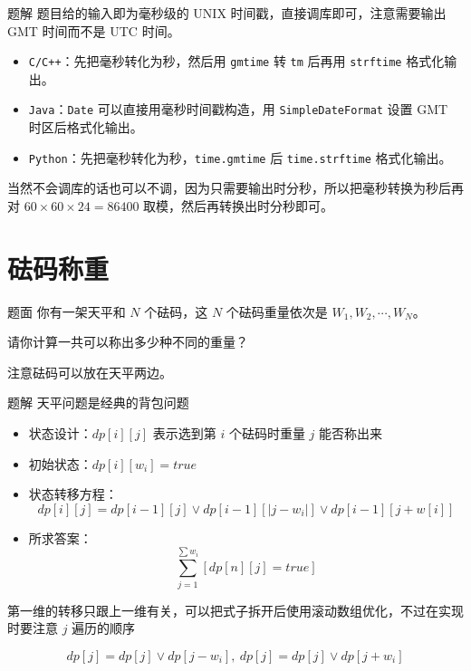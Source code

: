 \documentclass{pptt}
\begin{document}
\begin{frame}{题解}
    题目给的输入即为毫秒级的 UNIX 时间戳，直接调库即可，注意需要输出 GMT 时间而不是 UTC 时间。

    \begin{itemize}
        \item \texttt{C/C++}：先把毫秒转化为秒，然后用 \texttt{gmtime} 转 \texttt{tm} 后再用 \texttt{strftime} 格式化输出。
        \item \texttt{Java}：\texttt{Date} 可以直接用毫秒时间戳构造，用 \texttt{SimpleDateFormat} 设置 GMT 时区后格式化输出。
        \item \texttt{Python}：先把毫秒转化为秒，\texttt{time.gmtime} 后 \texttt{time.strftime} 格式化输出。
    \end{itemize}

    当然不会调库的话也可以不调，因为只需要输出时分秒，所以把毫秒转换为秒后再对 $60 \times 60 \times 24=86400$ 取模，然后再转换出时分秒即可。
\end{frame}

\section{砝码称重}

\begin{frame}{题面}
    你有一架天平和 $N$ 个砝码，这 $N$ 个砝码重量依次是 $W_1,W_2,\cdots,W_N$。

    请你计算一共可以称出多少种不同的重量？

    注意砝码可以放在天平两边。
\end{frame}

\begin{frame}{题解}
    天平问题是经典的背包问题

    \begin{itemize}
        \item 状态设计：$dp[i][j]$ 表示选到第 $i$ 个砝码时重量 $j$ 能否称出来
        \item 初始状态：$dp[i][w_i]=true$
        \item 状态转移方程：$$dp[i][j]=dp[i-1][j] \lor dp[i-1][|j-w_i|] \lor dp[i-1][j+w[i]]$$
        \item 所求答案：$$\sum_{j=1}^{\sum w_i}[dp[n][j]=true]$$
    \end{itemize}

    第一维的转移只跟上一维有关，可以把式子拆开后使用滚动数组优化，不过在实现时要注意 $j$ 遍历的顺序

    $$dp[j]=dp[j] \lor dp[j-w_i],~dp[j]=dp[j] \lor dp[j+w_i]$$
\end{frame}
\end{document}
